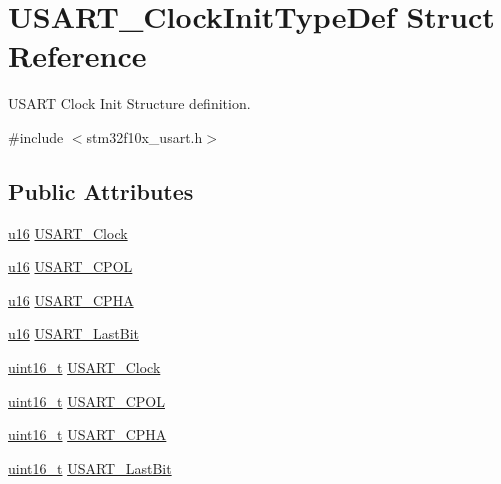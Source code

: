 \hypertarget{struct_u_s_a_r_t___clock_init_type_def}{}\section{U\+S\+A\+R\+T\+\_\+\+Clock\+Init\+Type\+Def Struct Reference}
\label{struct_u_s_a_r_t___clock_init_type_def}


U\+S\+A\+RT Clock Init Structure definition.  




{\ttfamily \#include $<$stm32f10x\+\_\+usart.\+h$>$}

\subsection*{Public Attributes}
\begin{DoxyCompactItemize}
\item 
\hyperlink{agilefox_2library_2inc_2stm32f10x__type_8h_a9e6c91d77e24643b888dbd1a1a590054}{u16} \hyperlink{struct_u_s_a_r_t___clock_init_type_def_ab9130e2347fea03337c4376666cccd3c}{U\+S\+A\+R\+T\+\_\+\+Clock}
\item 
\hyperlink{agilefox_2library_2inc_2stm32f10x__type_8h_a9e6c91d77e24643b888dbd1a1a590054}{u16} \hyperlink{struct_u_s_a_r_t___clock_init_type_def_ab6682632adcef3cb4955bc1e5cb1b262}{U\+S\+A\+R\+T\+\_\+\+C\+P\+OL}
\item 
\hyperlink{agilefox_2library_2inc_2stm32f10x__type_8h_a9e6c91d77e24643b888dbd1a1a590054}{u16} \hyperlink{struct_u_s_a_r_t___clock_init_type_def_a0aaf7f45ceb123898a63c476aa9cc7f3}{U\+S\+A\+R\+T\+\_\+\+C\+P\+HA}
\item 
\hyperlink{agilefox_2library_2inc_2stm32f10x__type_8h_a9e6c91d77e24643b888dbd1a1a590054}{u16} \hyperlink{struct_u_s_a_r_t___clock_init_type_def_ad4ffff3608ed5d5657500476cbe22453}{U\+S\+A\+R\+T\+\_\+\+Last\+Bit}
\item 
\hyperlink{_p_e___types_8h_a1f1825b69244eb3ad2c7165ddc99c956}{uint16\+\_\+t} \hyperlink{struct_u_s_a_r_t___clock_init_type_def_a229ba7c3f9a4d6d56513e6899f6c6693}{U\+S\+A\+R\+T\+\_\+\+Clock}
\item 
\hyperlink{_p_e___types_8h_a1f1825b69244eb3ad2c7165ddc99c956}{uint16\+\_\+t} \hyperlink{struct_u_s_a_r_t___clock_init_type_def_a01450cba8a40cf9a624b25979dc6aa77}{U\+S\+A\+R\+T\+\_\+\+C\+P\+OL}
\item 
\hyperlink{_p_e___types_8h_a1f1825b69244eb3ad2c7165ddc99c956}{uint16\+\_\+t} \hyperlink{struct_u_s_a_r_t___clock_init_type_def_abda3a2172bd5819e1c207dc0d1c822d8}{U\+S\+A\+R\+T\+\_\+\+C\+P\+HA}
\item 
\hyperlink{_p_e___types_8h_a1f1825b69244eb3ad2c7165ddc99c956}{uint16\+\_\+t} \hyperlink{struct_u_s_a_r_t___clock_init_type_def_ab1b28d63d2be6e57849666d78a4467bd}{U\+S\+A\+R\+T\+\_\+\+Last\+Bit}
\end{DoxyCompactItemize}


